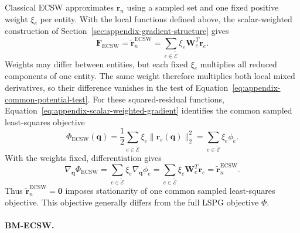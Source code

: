 \documentclass[a4paper,12pt]{article}
\newcommand{\vect}[1]{\boldsymbol{#1}}
\newcommand{\matr}[1]{\boldsymbol{#1}}
\begin{document}
Classical ECSW approximates $\vect{r}_n$ using a sampled set and one fixed positive weight $\xi_e$ per entity. With the local functions defined above, the scalar-weighted construction of Section~\ref{sec:appendix-gradient-structure} gives
\begin{equation}
 \vect{F}_{\mathrm{ECSW}}
 =\widetilde{\vect{r}}_n^{\mathrm{ECSW}}
 =\sum_{e\in\widetilde{\mathcal E}}\xi_e\matr{W}_e^T\vect{r}_e.
 \label{eq:appendix-classical-projected-vector}
\end{equation}
Weights may differ between entities, but each fixed $\xi_e$ multiplies all reduced components of one entity. The same weight therefore multiplies both local mixed derivatives, so their difference vanishes in the test of Equation~\eqref{eq:appendix-common-potential-test}. For these squared-residual functions, Equation~\eqref{eq:appendix-scalar-weighted-gradient} identifies the common sampled least-squares objective
\begin{equation}
 \Phi_{\mathrm{ECSW}}(\vect{q})
 =\frac12\sum_{e\in\widetilde{\mathcal E}}\xi_e\|\vect{r}_e(\vect{q})\|_2^2
 =\sum_{e\in\widetilde{\mathcal E}}\xi_e\phi_e.
 \label{eq:appendix-classical-objective}
\end{equation}
With the weights fixed, differentiation gives
\begin{equation}
 \nabla_{\vect{q}}\Phi_{\mathrm{ECSW}}
 =\sum_{e\in\widetilde{\mathcal E}}\xi_e\nabla_{\vect{q}}\phi_e
 =\sum_{e\in\widetilde{\mathcal E}}\xi_e\matr{W}_e^T\vect{r}_e
 =\widetilde{\vect{r}}_n^{\mathrm{ECSW}}.
 \label{eq:appendix-classical-gradient}
\end{equation}
Thus $\widetilde{\vect{r}}_n^{\mathrm{ECSW}}=\vect{0}$ imposes stationarity of one common sampled least-squares objective. This objective generally differs from the full LSPG objective $\Phi$.

\paragraph{BM-ECSW.}
\label{sec:appendix-bm-objective}
\end{document}
